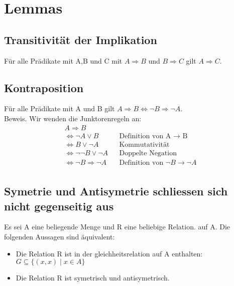 \section{Lemmas}
\subsection{Transitivität der Implikation}
Für alle Prädikate mit A,B und C mit \(A \Rightarrow B\) und \(B \Rightarrow C\) gilt \(A \Rightarrow C\).
\subsection{Kontraposition}
Für alle Prädikate mit A und B gilt \(A \Rightarrow B \Leftrightarrow \neg B \Rightarrow \neg A\).\\
Beweis. Wir wenden die Junktorenregeln an:\\
\begin{align*}
    A \Rightarrow B \\
    \Leftrightarrow \neg A \vee B && \text{Definition von A $\rightarrow$ B}\\
    \Leftrightarrow B \vee \neg A && \text{Kommutativität}\\
    \Leftrightarrow \neg\neg B \vee \neg A && \text{Doppelte Negation}\\
    \Leftrightarrow \neg B \Rightarrow \neg A && \text{Definition von $\neg B \rightarrow \neg A$}\\
\end{align*}
\subsection{Symetrie und Antisymetrie schliessen sich nicht gegenseitig aus}
Es sei A eine beliegende Menge und R eine beliebige Relation. auf A. Die folgenden Aussagen sind äquivalent:\\
\begin{itemize}
    \item Die Relation R ist in der gleichheitsrelation auf A enthalten:\\ $G \subseteq \{(x,x) \mid x \in A\}$
    \item Die Relation R ist symetrisch und antisymetrisch.
\end{itemize}